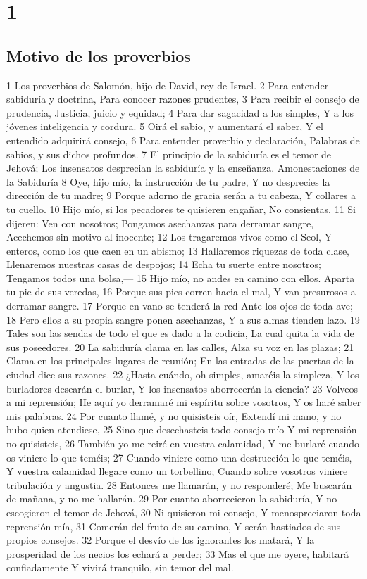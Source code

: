 
\chapter{1}

\section*{Motivo de los proverbios}

1 Los proverbios de Salomón, hijo de David, rey de Israel.
2 Para entender sabiduría y doctrina,
Para conocer razones prudentes,
3 Para recibir el consejo de prudencia,
Justicia, juicio y equidad;
4 Para dar sagacidad a los simples,
Y a los jóvenes inteligencia y cordura.
5 Oirá el sabio, y aumentará el saber,
Y el entendido adquirirá consejo,
6 Para entender proverbio y declaración,
Palabras de sabios, y sus dichos profundos.
7 El principio de la sabiduría es el temor de Jehová; 
Los insensatos desprecian la sabiduría y la enseñanza.
Amonestaciones de la Sabiduría
8 Oye, hijo mío, la instrucción de tu padre,
Y no desprecies la dirección de tu madre;
9 Porque adorno de gracia serán a tu cabeza, 
Y collares a tu cuello.
10 Hijo mío, si los pecadores te quisieren engañar, 
No consientas. 
11 Si dijeren: Ven con nosotros;
Pongamos asechanzas para derramar sangre,
Acechemos sin motivo al inocente;
12 Los tragaremos vivos como el Seol,
Y enteros, como los que caen en un abismo;
13 Hallaremos riquezas de toda clase,
Llenaremos nuestras casas de despojos;
14 Echa tu suerte entre nosotros;
Tengamos todos una bolsa,—
15 Hijo mío, no andes en camino con ellos.
Aparta tu pie de sus veredas,
16 Porque sus pies corren hacia el mal,
Y van presurosos a derramar sangre.
17 Porque en vano se tenderá la red
Ante los ojos de toda ave; 
18 Pero ellos a su propia sangre ponen asechanzas,
Y a sus almas tienden lazo.
19 Tales son las sendas de todo el que es dado a la codicia,
La cual quita la vida de sus poseedores.
20 La sabiduría clama en las calles,
Alza su voz en las plazas;
21 Clama en los principales lugares de reunión;
En las entradas de las puertas de la ciudad dice sus razones. 
22 ¿Hasta cuándo, oh simples, amaréis la simpleza,
Y los burladores desearán el burlar,
Y los insensatos aborrecerán la ciencia?
23 Volveos a mi reprensión;
He aquí yo derramaré mi espíritu sobre vosotros,
Y os haré saber mis palabras.
24 Por cuanto llamé, y no quisisteis oír,
Extendí mi mano, y no hubo quien atendiese,
25 Sino que desechasteis todo consejo mío
Y mi reprensión no quisisteis,
26 También yo me reiré en vuestra calamidad,
Y me burlaré cuando os viniere lo que teméis;
27 Cuando viniere como una destrucción lo que teméis,
Y vuestra calamidad llegare como un torbellino;
Cuando sobre vosotros viniere tribulación y angustia.
28 Entonces me llamarán, y no responderé;
Me buscarán de mañana, y no me hallarán.
29 Por cuanto aborrecieron la sabiduría,
Y no escogieron el temor de Jehová,
30 Ni quisieron mi consejo,
Y menospreciaron toda reprensión mía,
31 Comerán del fruto de su camino,
Y serán hastiados de sus propios consejos.
32 Porque el desvío de los ignorantes los matará,
Y la prosperidad de los necios los echará a perder;
33 Mas el que me oyere, habitará confiadamente
Y vivirá tranquilo, sin temor del mal.

